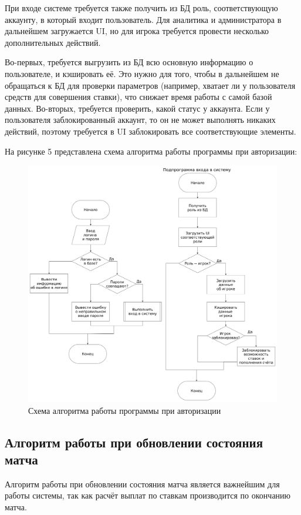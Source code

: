 При входе системе требуется также получить из БД роль, соответствующую аккаунту, в который входит пользователь.
Для аналитика и администратора в дальнейшем загружается UI, но для игрока требуется провести несколько дополнительных действий.

Во-первых, требуется выгрузить из БД всю основную информацию о пользователе, и кэшировать её.
Это нужно для того, чтобы в дальнейшем не обращаться к БД для проверки параметров (например, хватает ли у пользователя средств для совершения ставки), что снижает время работы с самой базой данных.
Во-вторых, требуется проверить, какой статус у аккаунта. 
Если у пользователя заблокированный аккаунт, то он не может выполнять никаких действий, поэтому требуется в UI заблокировать все соответствующие элементы.

\newpage
На рисунке 5 представлена схема алгоритма работы программы при авторизации:
\FloatBarrier
\begin{figure}[h]	
	\begin{center}
		\includegraphics[width=\linewidth]{inc/auth.png}
	\end{center}
	\captionsetup{justification=centering, labelsep=defffis}
	\caption{Схема алгоритма работы программы при авторизации}
	\label{fig::auth}
\end{figure}
\FloatBarrier

\newpage
\subsection{Алгоритм работы при обновлении состояния матча}
Алгоритм работы при обновлении состояния матча является важнейшим для работы системы, так как расчёт выплат по ставкам производится по окончанию матча.

